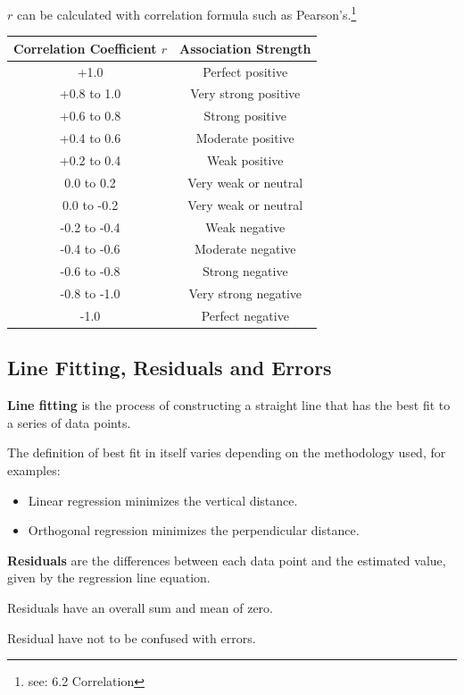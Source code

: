 \documentclass{article}
\begin{document}
$r$ can be calculated with correlation formula such as Pearson's.\footnote{see: 6.2 Correlation}

\begin{center}
\begin{tabular}{|c|c|}
\hline
Correlation Coefficient $r$ & Association Strength \\ \hline
+1.0 & Perfect positive \\ \hline
+0.8 to 1.0 & Very strong positive \\ \hline
+0.6 to 0.8 & Strong positive \\ \hline
+0.4 to 0.6 & Moderate positive \\ \hline
+0.2 to 0.4 & Weak positive \\ \hline
0.0 to 0.2 & Very weak or neutral \\ \hline
0.0 to -0.2 & Very weak or neutral \\ \hline
-0.2 to -0.4 & Weak negative \\ \hline
-0.4 to -0.6 & Moderate negative \\ \hline
-0.6 to -0.8 & Strong negative \\ \hline
-0.8 to -1.0 & Very strong negative \\ \hline
-1.0  & Perfect negative \\
\hline
\end{tabular}
\end{center}

\subsection{Line Fitting, Residuals and Errors}
\textbf{Line fitting} is the process of constructing a straight line that has the best fit to a series of data points.

The definition of best fit in itself varies depending on the methodology used, for examples:
\begin{itemize}
    \item Linear regression minimizes the vertical distance.
    \item Orthogonal regression minimizes the perpendicular distance.
\end{itemize}

\textbf{Residuals} are the differences between each data point and the estimated value, given by the regression line equation.

Residuals have an overall sum and mean of zero.

Residual have not to be confused with errors.
\end{document}
